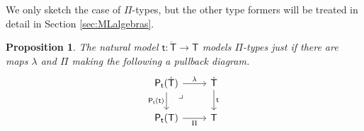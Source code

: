 \documentclass[12pt]{article}
\newcommand{\alg}[1]{\ensuremath{\mathsf{#1}}}
\renewcommand{\to}{\ensuremath{\rightarrow}}
\renewcommand{\t}{\ensuremath{\mathsf{t}}}
\newcommand{\tT}{\ensuremath{{\t}:\TT\to\T}}
\newcommand{\T}{\ensuremath{\mathsf{T}}}
\newcommand{\TT}{\ensuremath{\dot{\mathsf{T}}}}
\newcommand{\pbcorner}{\arrow[dr,phantom,"\lrcorner" very near start, shift right=.5ex]} %
\newtheorem{proposition}[theorem]{Proposition}
\theoremstyle{remark}
\theoremstyle{definition}
\begin{document}
We only sketch the case of $\Pi$-types, but the other type formers will be treated in detail in Section \ref{sec:MLalgebras}.

\begin{proposition}  The natural model $\tT$ models $\Pi$-types just if there are maps $\lambda$ and $\Pi$ making the following a pullback diagram. 
\begin{equation}\label{diag:prod2}
\begin{tikzcd}
\alg{P}_\t(\TT)  \ar[d,swap, "{\alg{P}_\t(\t)}"]   \ar[r, "\lambda"]  \pbcorner &  \TT \ar[d, "{\t}"]\\
\alg{P}_\t(\T)	\ar[r,swap, "{\Pi}"] & \T
\end{tikzcd}
\end{equation}
\end{proposition}
\end{document}
